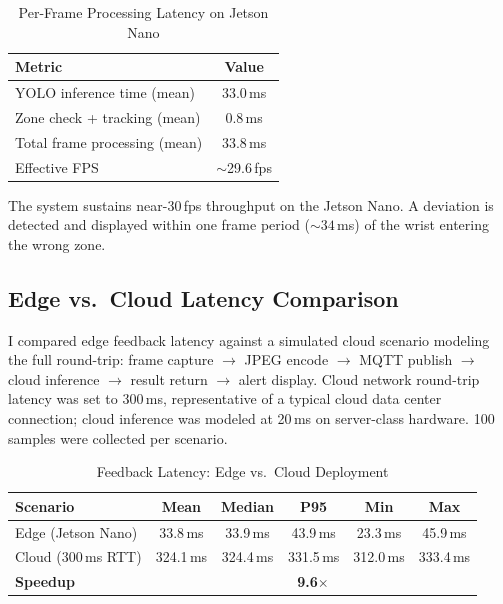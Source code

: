 \documentclass[conference]{IEEEtran}
\begin{document}
\begin{table}[htbp]
\caption{Per-Frame Processing Latency on Jetson Nano}
\label{tab:latency}
\centering
\begin{tabular}{lc}
\toprule
\textbf{Metric} & \textbf{Value} \\
\midrule
YOLO inference time (mean) & 33.0\,ms \\
Zone check + tracking (mean) & 0.8\,ms \\
Total frame processing (mean) & 33.8\,ms \\
Effective FPS & ${\sim}$29.6\,fps \\
\bottomrule
\end{tabular}
\end{table}

The system sustains near-30\,fps throughput on the Jetson Nano. A deviation is detected and displayed within one frame period (${\sim}34$\,ms) of the wrist entering the wrong zone.

\subsection{Edge vs.\ Cloud Latency Comparison}

I compared edge feedback latency against a simulated cloud scenario modeling the full round-trip: frame capture $\rightarrow$ JPEG encode $\rightarrow$ MQTT publish $\rightarrow$ cloud inference $\rightarrow$ result return $\rightarrow$ alert display. Cloud network round-trip latency was set to 300\,ms, representative of a typical cloud data center connection; cloud inference was modeled at 20\,ms on server-class hardware. 100 samples were collected per scenario.

\begin{table}[htbp]
\caption{Feedback Latency: Edge vs.\ Cloud Deployment}
\label{tab:edgevscloud}
\centering
\begin{tabular}{lccccc}
\toprule
\textbf{Scenario} & \textbf{Mean} & \textbf{Median} & \textbf{P95} & \textbf{Min} & \textbf{Max} \\
\midrule
Edge (Jetson Nano) & 33.8\,ms & 33.9\,ms & 43.9\,ms & 23.3\,ms & 45.9\,ms \\
Cloud (300\,ms RTT) & 324.1\,ms & 324.4\,ms & 331.5\,ms & 312.0\,ms & 333.4\,ms \\
\midrule
\textbf{Speedup} & \multicolumn{5}{c}{\textbf{9.6$\times$}} \\
\bottomrule
\end{tabular}
\end{table}
\end{document}
